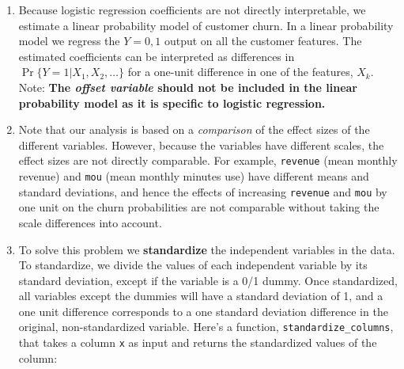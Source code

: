 \documentclass[
]{article}
\providecommand{\tightlist}{%
  \setlength{\itemsep}{0pt}\setlength{\parskip}{0pt}}
\begin{document}
\begin{enumerate}
\def\labelenumi{\arabic{enumi}.}
\tightlist
\item
  Because logistic regression coefficients are not directly
  interpretable, we estimate a linear probability model of customer
  churn. In a linear probability model we regress the \(Y=0,1\) output
  on all the customer features. The estimated coefficients can be
  interpreted as differences in \(\Pr\{Y=1 | X_1, X_2, \dots\}\) for a
  one-unit difference in one of the features, \(X_k\). Note: \textbf{The
  \emph{offset variable} should not be included in the linear
  probability model as it is specific to logistic regression.}
\item
  Note that our analysis is based on a \emph{comparison} of the effect
  sizes of the different variables. However, because the variables have
  different scales, the effect sizes are not directly comparable. For
  example, \texttt{revenue} (mean monthly revenue) and \texttt{mou}
  (mean monthly minutes use) have different means and standard
  deviations, and hence the effects of increasing \texttt{revenue} and
  \texttt{mou} by one unit on the churn probabilities are not comparable
  without taking the scale differences into account.
\item
  To solve this problem we \textbf{standardize} the independent
  variables in the data. To standardize, we divide the values of each
  independent variable by its standard deviation, except if the variable
  is a 0/1 dummy. Once standardized, all variables except the dummies
  will have a standard deviation of 1, and a one unit difference
  corresponds to a one standard deviation difference in the original,
  non-standardized variable. Here's a function,
  \texttt{standardize\_columns}, that takes a column \texttt{x} as input
  and returns the standardized values of the column:
\end{enumerate}
\end{document}
